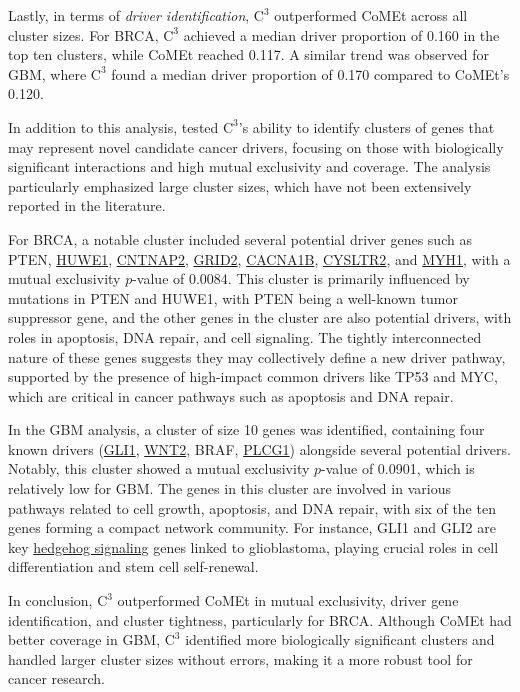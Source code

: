 Lastly, in terms of \textit{driver identification}, $\mathrm{C}^3$ outperformed CoMEt across all cluster sizes. For BRCA, $\mathrm{C}^3$ achieved a median driver proportion of 0.160 in the top ten clusters, while CoMEt reached 0.117. A similar trend was observed for GBM, where $\mathrm{C}^3$ found a median driver proportion of 0.170 compared to CoMEt's 0.120.

In addition to this analysis, \textcite{c3} tested $\mathrm{C}^3$'s ability to identify clusters of genes that may represent novel candidate cancer drivers, focusing on those with biologically significant interactions and high mutual exclusivity and coverage. The analysis particularly emphasized large cluster sizes, which have not been extensively reported in the literature.

For BRCA, a notable cluster included several potential driver genes such as PTEN, \href{https://www.ncbi.nlm.nih.gov/gene/10075}{HUWE1}, \href{https://www.ncbi.nlm.nih.gov/gene/26047}{CNTNAP2}, \href{https://www.ncbi.nlm.nih.gov/gene/2895}{GRID2}, \href{https://www.ncbi.nlm.nih.gov/gene/774}{CACNA1B}, \href{https://www.ncbi.nlm.nih.gov/gene/57105}{CYSLTR2}, and \href{https://www.ncbi.nlm.nih.gov/gene/4619}{MYH1}, with a mutual exclusivity $p$-value of 0.0084. This cluster is primarily influenced by mutations in PTEN and HUWE1, with PTEN being a well-known tumor suppressor gene, and the other genes in the cluster are also potential drivers, with roles in apoptosis, DNA repair, and cell signaling. The tightly interconnected nature of these genes suggests they may collectively define a new driver pathway, supported by the presence of high-impact common drivers like TP53 and MYC, which are critical in cancer pathways such as apoptosis and DNA repair.

In the GBM analysis, a cluster of size 10 genes was identified, containing four known drivers (\href{https://www.ncbi.nlm.nih.gov/gene/2735}{GLI1}, \href{https://www.ncbi.nlm.nih.gov/gene/7472}{WNT2}, BRAF, \href{https://www.ncbi.nlm.nih.gov/gene/7472}{PLCG1}) alongside several potential drivers. Notably, this cluster showed a mutual exclusivity $p$-value of 0.0901, which is relatively low for GBM. The genes in this cluster are involved in various pathways related to cell growth, apoptosis, and DNA repair, with six of the ten genes forming a compact network community. For instance, GLI1 and GLI2 are key \href{https://en.wikipedia.org/wiki/Hedgehog_signaling_pathway}{hedgehog signaling} genes linked to glioblastoma, playing crucial roles in cell differentiation and stem cell self-renewal.

In conclusion, $\mathrm{C}^3$ outperformed CoMEt in mutual exclusivity, driver gene identification, and cluster tightness, particularly for BRCA. Although CoMEt had better coverage in GBM, $\mathrm{C}^3$ identified more biologically significant clusters and handled larger cluster sizes without errors, making it a more robust tool for cancer research.

\cleardoublepage
